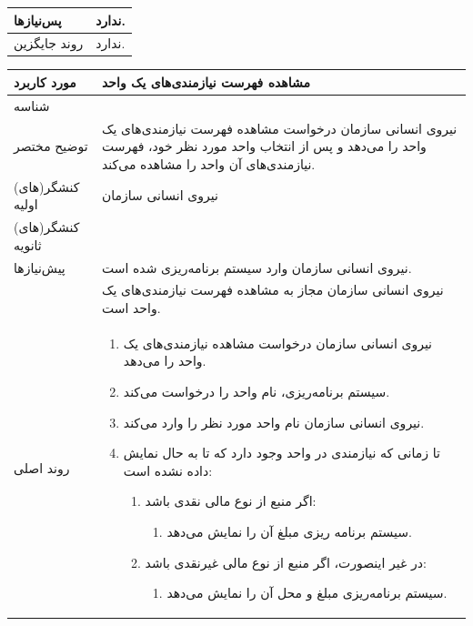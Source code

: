 \begin{table}[H]
\begin{tabular}{|p{3cm}|p{10cm}|}
		\hline
		پس‌نیازها & ندارد. \\
		\hline
		روند جایگزین & ندارد. \\
		\hline
	\end{tabular}
\end{table}


\begin{table}[H]
	\centering
	\begin{tabular}{|p{3cm}|p{10cm}|}
		\hline
		مورد کاربرد & مشاهده فهرست نیازمندی‌های یک واحد  \\
		\hline
		شناسه & 
		\stepcounter{usecase_ID}
		\arabic{usecase_ID} \\
		\hline
		توضیح مختصر & نیروی انسانی سازمان درخواست مشاهده فهرست نیازمندی‌های یک واحد را می‌دهد و پس از انتخاب واحد مورد نظر خود، فهرست نیازمندی‌های آن واحد را مشاهده می‌کند.\\
		\hline
		کنشگر(های) اولیه & نیروی انسانی سازمان \\
		\hline
		کنشگر(های) ثانویه &  \\
		\hline
		پیش‌نیازها & نیروی انسانی سازمان وارد سیستم برنامه‌ریزی شده است. \\
		& نیروی انسانی سازمان مجاز به مشاهده فهرست نیازمندی‌های یک واحد است. \\
		\hline
		
		روند اصلی &
		\begin{enumerate}[topsep=0cm,leftmargin=0.5cm]
			\item نیروی انسانی سازمان درخواست مشاهده نیازمندی‌های یک واحد را می‌دهد.
			\item سیستم برنامه‌ریزی، نام واحد را درخواست می‌کند.
			\item نیروی انسانی سازمان نام واحد مورد نظر را وارد می‌کند.
			\item تا زمانی که نیازمندی در واحد وجود دارد که تا به حال نمایش داده نشده است:
			\begin{enumerate}[topsep=0cm,leftmargin=0.5cm]
				
				\item اگر منبع از نوع مالی نقدی باشد:
				\begin{enumerate}[topsep=0cm,leftmargin=0.5cm]
					\item سیستم برنامه ریزی مبلغ آن را نمایش می‌دهد.
				\end{enumerate}
				\item در غیر اینصورت، اگر منبع از نوع مالی غیرنقدی باشد:
				\begin{enumerate}[topsep=0cm,leftmargin=0.5cm]
					\item سیستم برنامه‌ریزی مبلغ و محل آن را نمایش می‌دهد.
				\end{enumerate}


\end{enumerate}
\end{enumerate}
\end{tabular}
\end{table}
